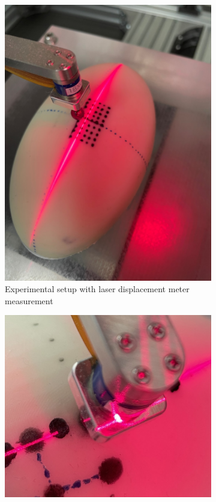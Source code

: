 \begin{figure}
    \centering
    \begin{subfigure}[b]{0.5\textwidth}
    \centering
    \includegraphics[width=\textwidth]{Images/validationcase/defprof/defprofexp.png}
    \caption{Experimental setup with laser displacement meter measurement}
    \label{fig:defprofexce}
    \end{subfigure}
    \hfill
    \begin{subfigure}[b]{0.5\textwidth}
    \centering
    \includegraphics[width=\textwidth]{Images/validationcase/defprof/interferencedef.png}

\end{subfigure}
\end{figure}
